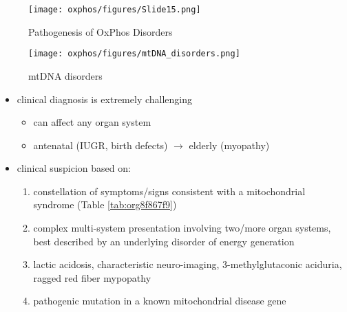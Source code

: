 \documentclass[12pt]{scrartcl}
\begin{document}
\begin{figure}[htbp]
\centering
\texttt{[image: oxphos/figures/Slide15.png]}
\caption[ETC]{\label{fig:org31b2640}Pathogenesis of OxPhos Disorders}
\end{figure}


\begin{figure}[htbp]
\centering
\texttt{[image: oxphos/figures/mtDNA\_disorders.png]}
\caption{\label{fig:org2b6004f}mtDNA disorders}
\end{figure}

\begin{itemize}
\item clinical diagnosis is extremely challenging
\begin{itemize}
\item can affect any organ system
\item antenatal (IUGR, birth defects) \(\to\) elderly (myopathy)
\end{itemize}

\item clinical suspicion based on:
\begin{enumerate}
\item constellation of symptoms/signs consistent with a mitochondrial syndrome (Table \ref{tab:org8f867f9})
\item complex multi-system presentation involving two/more organ systems,
best described by an underlying disorder of energy generation
\item lactic acidosis, characteristic neuro-imaging, 3-methylglutaconic
aciduria, ragged red fiber mypopathy
\item pathogenic mutation in a known mitochondrial disease gene
\end{enumerate}
\end{itemize}
\end{document}
